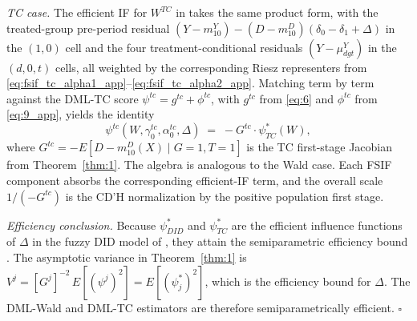 \begin{propproof}
\noindent\textit{TC case.} The efficient IF for $W^{TC}$ in \citet[Supplementary Data, Equation~69]{fuzzy2018} takes the same product form, with the treated-group pre-period residual $(Y - m^Y_{10}) - (D - m^D_{10})(\delta_0 - \delta_1 + \Delta)$ in the $(1,0)$ cell and the four treatment-conditional residuals $(Y - \mu^Y_{dgt})$ in the $(d,0,t)$ cells, all weighted by the corresponding Riesz representers from \eqref{eq:fsif_tc_alpha1_app}--\eqref{eq:fsif_tc_alpha2_app}. Matching term by term against the DML-TC score $\psi^{tc} = g^{tc} + \phi^{tc}$, with $g^{tc}$ from \eqref{eq:6} and $\phi^{tc}$ from \eqref{eq:9_app}, yields the identity
\begin{equation*}
    \psi^{tc}(W,\gamma^{tc}_0,\alpha^{tc}_0,\Delta) \;=\; -G^{tc}\cdot\psi^{*}_{TC}(W),
\end{equation*}
where $G^{tc} = -E[D - m^D_{10}(X) \mid G\!=\!1,T\!=\!1]$ is the TC first-stage Jacobian from Theorem~\ref{thm:1}. The algebra is analogous to the Wald case. Each FSIF component absorbs the corresponding efficient-IF term, and the overall scale $1/(-G^{tc})$ is the CD'H normalization by the positive population first stage.

\medskip
\noindent\textit{Efficiency conclusion.} Because $\psi^{*}_{DID}$ and $\psi^{*}_{TC}$ are the efficient influence functions of $\Delta$ in the fuzzy DID model of \citet{fuzzy2018}, they attain the semiparametric efficiency bound \citep{hahn1998, newey1994asymptotic}. The asymptotic variance in Theorem~\ref{thm:1} is $V^{j} = [G^{j}]^{-2}\,E[(\psi^{j})^2] = E[(\psi^{*}_{j})^2]$, which is the efficiency bound for $\Delta$. The DML-Wald and DML-TC estimators are therefore semiparametrically efficient. $\square$

\end{propproof}

